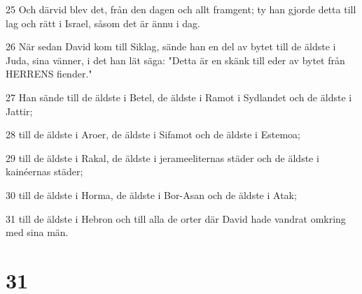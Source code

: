 \par 25 Och därvid blev det, från den dagen och allt framgent; ty han gjorde detta till lag och rätt i Israel, såsom det är ännu i dag.
\par 26 När sedan David kom till Siklag, sände han en del av bytet till de äldste i Juda, sina vänner, i det han lät säga: "Detta är en skänk till eder av bytet från HERRENS fiender."
\par 27 Han sände till de äldste i Betel, de äldste i Ramot i Sydlandet och de äldste i Jattir;
\par 28 till de äldste i Aroer, de äldste i Sifamot och de äldste i Estemoa;
\par 29 till de äldste i Rakal, de äldste i jerameeliternas städer och de äldste i kainéernas städer;
\par 30 till de äldste i Horma, de äldste i Bor-Asan och de äldste i Atak;
\par 31 till de äldste i Hebron och till alla de orter där David hade vandrat omkring med sina män.

\chapter{31}

